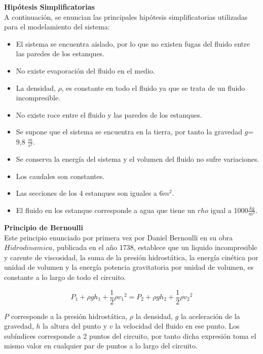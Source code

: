 \documentclass[11pt,letterpaper,spanish,notitlepage]{report}
\begin{document}
\newpage

\textbf{Hipótesis Simplificatorias}\\
\justify A continuación, se enuncian las principales hipótesis simplificatorias utilizadas para el modelamiento del sistema:\\
\begin{itemize}
    \item El sistema se encuentra aislado, por lo que no existen fugas del fluido entre las paredes de los estanques.
    \item No existe evaporación del fluido en el medio.
     \item La densidad, $\rho$, es constante en todo el fluido ya que se trata de un fluido incompresible.
     \item No existe roce entre el fluido y las paredes de los estanques.
     \item Se supone que el sistema se encuentra en la tierra, por tanto la gravedad $g$= 9,8 $\frac{m}{s^2}$.
     \item Se conserva la energía del sistema y el volumen del fluido no sufre variaciones.
     \item Los caudales son constantes.
     \item Las secciones de los 4 estanques son iguales a 6$m^{2}$.
     \item El fluido en los estanque corresponde a agua que tiene un $rho$ igual a 1000$\frac{kg}{m^{3}}$.
\end{itemize}

\textbf{Principio de Bernoulli}\\
\justify Este principio enunciado por primera vez por Daniel Bernoulli en su obra $Hidrodinamica$, publicada en el año 1738, establece que un liquido incompresible y carente de viscosidad, la suma de la presión hidrostática, la energía cinética por unidad de volumen y la energía potencia gravitatoria por unidad de volumen, es constante a lo largo de todo el circuito. 



\begin{equation}\label{eq:venturi}
    P_{1}+\rho gh_{1}+\frac{1}{2}\rho {v_{1}}^2 = P_{2}+\rho gh_{2}+\frac{1}{2}\rho {v_{2}}^2
\end{equation}




\justify \textbf{$P$} corresponde a la presión hidrostática, \textbf{$\rho$} la densidad, \textbf{$g$} la aceleración de la gravedad, \textbf{$h$} la altura del punto y \textbf{$v$} la velocidad del fluido en ese punto. Los subíndices corresponde a 2 puntos del circuito, por tanto dicha expresión toma el mismo valor en cualquier par de puntos a lo largo del circuito.\\
\end{document}
